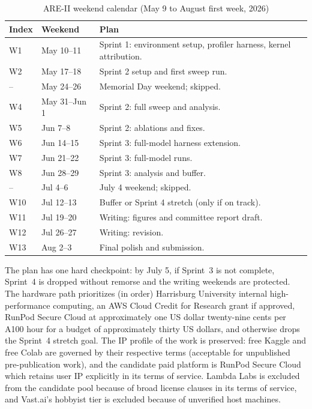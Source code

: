 \documentclass[11pt]{article}
\begin{document}
\begin{table}[h!]
\centering
\caption{ARE-II weekend calendar (May 9 to August first week, 2026)}
\label{tab:areii-calendar}
\small
\begin{tabularx}{\textwidth}{l l X}
\toprule
\textbf{Index} & \textbf{Weekend} & \textbf{Plan} \\
\midrule
W1 & May 10--11 & Sprint 1: environment setup, profiler harness, kernel attribution. \\
W2 & May 17--18 & Sprint 2 setup and first sweep run. \\
-- & May 24--26 & Memorial Day weekend; skipped. \\
W4 & May 31--Jun 1 & Sprint 2: full sweep and analysis. \\
W5 & Jun 7--8 & Sprint 2: ablations and fixes. \\
W6 & Jun 14--15 & Sprint 3: full-model harness extension. \\
W7 & Jun 21--22 & Sprint 3: full-model runs. \\
W8 & Jun 28--29 & Sprint 3: analysis and buffer. \\
-- & Jul 4--6 & July 4 weekend; skipped. \\
W10 & Jul 12--13 & Buffer or Sprint 4 stretch (only if on track). \\
W11 & Jul 19--20 & Writing: figures and committee report draft. \\
W12 & Jul 26--27 & Writing: revision. \\
W13 & Aug 2--3 & Final polish and submission. \\
\bottomrule
\end{tabularx}
\end{table}

\noindent The plan has one hard checkpoint: by July 5, if Sprint~3 is not complete, Sprint~4 is dropped without remorse and the writing weekends are protected. The hardware path prioritizes (in order) Harrisburg University internal high-performance computing, an AWS Cloud Credit for Research grant if approved, RunPod Secure Cloud at approximately one US dollar twenty-nine cents per A100 hour for a budget of approximately thirty US dollars, and otherwise drops the Sprint~4 stretch goal. The IP profile of the work is preserved: free Kaggle and free Colab are governed by their respective terms (acceptable for unpublished pre-publication work), and the candidate paid platform is RunPod Secure Cloud which retains user IP explicitly in its terms of service. Lambda Labs is excluded from the candidate pool because of broad license clauses in its terms of service, and Vast.ai's hobbyist tier is excluded because of unverified host machines.
\end{document}
